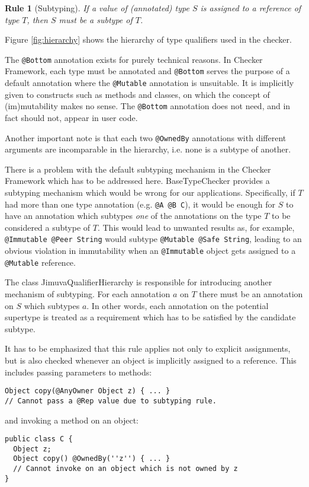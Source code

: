 \documentclass{pracamgr}
\theoremstyle{break}
\theoremstyle{break}
\theoremstyle{break}
\newtheorem{verrule}{Rule}
\begin{document}
\setcounter{verrule}{-1}
\begin{verrule}[Subtyping]
  If a value of (annotated) type $S$ is assigned to a reference of type $T$, 
  then $S$ must be a subtype of $T$.
\end{verrule}
Figure \ref{fig:hierarchy} shows the hierarchy of type qualifiers used
in the checker. 

The \texttt{@Bottom} annotation exists for purely technical
reasons. In Checker Framework, each type must be annotated and
\texttt{@Bottom} serves the purpose of a default annotation where the
\texttt{@Mutable} annotation is unsuitable. It is implicitly given to
constructs such as methods and classes, on which the concept of
(im)mutability makes no sense. The \texttt{@Bottom} annotation does
not need, and in fact should not, appear in user code. 

Another important note is that each two \texttt{@OwnedBy} annotations
with different arguments are incomparable in the hierarchy, i.e. none
is a subtype of another.

There is a problem with the default subtyping mechanism in the Checker
Framework which has to be addressed here. BaseTypeChecker provides a
subtyping mechanism which would be wrong for our
applications. Specifically, if $T$ had more than one type annotation
(e.g. \texttt{@A @B C}), it would be enough for $S$ to have an
annotation which subtypes \emph{one} of the annotations on the type
$T$ to be considered a subtype of $T$. This would lead to unwanted
results as, for example, \texttt{@Immutable @Peer String} would
subtype \texttt{@Mutable @Safe String}, leading to an obvious
violation in immutability when an \texttt{@Immutable} object gets
assigned to a \texttt{@Mutable} reference.

The class JimuvaQualifierHierarchy is responsible for introducing
another mechanism of subtyping. For each annotation $a$ on $T$ there
must be an annotation on $S$ which subtypes $a$. In other words, each
annotation on the potential supertype is treated as a requirement
which has to be satisfied by the candidate subtype. 

It has to be emphasized that this rule applies not only to explicit
assignments, but is also checked whenever an object is implicitly
assigned to a reference. This includes passing parameters to methods:
\begin{lstlisting}
Object copy(@AnyOwner Object z) { ... } 
// Cannot pass a @Rep value due to subtyping rule.
\end{lstlisting}
and invoking a method on an object: 
\begin{lstlisting}
public class C {
  Object z;
  Object copy() @OwnedBy(''z'') { ... } 
  // Cannot invoke on an object which is not owned by z
}
\end{lstlisting}
\end{document}
